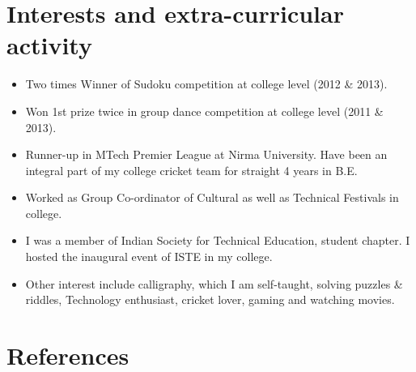 \documentclass[11pt,a4paper,sans]{moderncv}        %
\begin{document}
\section{Interests and extra-curricular activity}

\vspace{8pt}

\begin{itemize}

\item{Two times Winner of Sudoku competition at college level (2012 \& 2013).}

\vspace{8pt}

\item{Won 1st prize twice in group dance competition at college level (2011 \& 2013).}

\vspace{8pt}

\item{Runner-up in MTech Premier League at Nirma University. Have been an integral part of my college cricket team for straight 4 years in B.E.}

\vspace{8pt}

\item{Worked as Group Co-ordinator of Cultural as well as Technical Festivals in college.}

\vspace{8pt}

\item{I was a member of Indian Society for Technical Education, student chapter. I hosted the inaugural event of ISTE in my college.}

\vspace{8pt}

\item{Other interest include calligraphy, which I am self-taught, solving puzzles \& riddles, Technology enthusiast, cricket lover, gaming and watching movies.}

\end{itemize}

\section{References}
\end{document}
